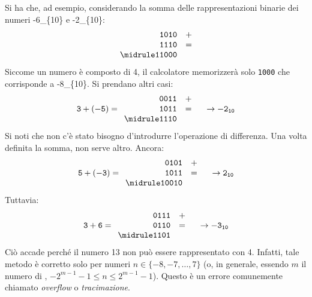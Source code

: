 Si ha che, ad esempio, considerando la somma delle rappresentazioni binarie dei numeri \num[parse-numbers=false]{-6_{10}} e \num[parse-numbers=false]{-2_{10}}:
\[
	\begin{array}{r l}
\mathtt{1010}	&+	\\
\mathtt{1110}	&=	\\
		\midrule
\mathtt{11000}
	\end{array}
\]
Siccome un numero è composto di \SI{4}{\bit}, il calcolatore memorizzerà solo \lstinline!1000! che corrisponde a \num[parse-numbers=false]{-8_{10}}.
Si prendano altri casi:
\[
\mathtt{
3+(-5)=
	\begin{array}{r l}
\mathtt{0011}	&+	\\
\mathtt{1011}	&=	\\
		\midrule
\mathtt{1110}
	\end{array}
\quad \rightarrow-2_{10}
}
\]
Si noti che non c'è stato bisogno d'introdurre l'operazione di differenza.
Una volta definita la somma, non serve altro.
Ancora:
\[
\mathtt{
5+(-3)=
	\begin{array}{r l}
\mathtt{0101}	&+	\\
\mathtt{1011}	&=	\\
		\midrule
\mathtt{10010}
	\end{array}
\quad \rightarrow2_{10}
}
\]
Tuttavia:
\[
\mathtt{
3+6=
	\begin{array}{r l}
\mathtt{0111}	&+	\\
\mathtt{0110}	&=	\\
		\midrule
\mathtt{1101}
	\end{array}
\quad \rightarrow-3_{10}
}
\]
Ciò accade perché il numero \num{13} non può essere rappresentato con \SI{4}{\bit}.
Infatti, tale metodo è corretto solo per numeri $n\in\{-8,-7,\dots,7\}$ (o, in generale, essendo $m$ il numero di \si{\bit}, $-2^{m-1}-1\le n \le 2^{m-1}-1$).
Questo è un errore comunemente chiamato \emph{overflow} o \emph{tracimazione}.

